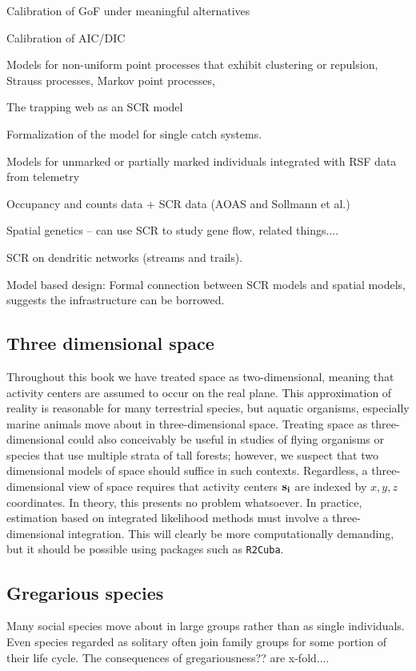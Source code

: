 Calibration of GoF under meaningful alternatives

Calibration of AIC/DIC 

Models for non-uniform point processes that exhibit clustering or
repulsion, Strauss processes, Markov point processes, 

The trapping web as an SCR model 

Formalization of the model for single catch systems. 

Models for unmarked or partially marked individuals integrated with
RSF data from telemetry

Occupancy and counts data + SCR data (AOAS and Sollmann et al.)

Spatial genetics  -- can use SCR to study gene flow, related things....

SCR on dendritic networks (streams and trails).

Model based design: Formal connection between SCR models and spatial
models, suggests the infrastructure can be borrowed.

\subsection{Three dimensional space}

Throughout this book we have treated space as
two-dimensional, meaning that activity centers are assumed to occur on
the real plane. This approximation of reality is reasonable for many
terrestrial species, but aquatic organisms, especially marine animals
move about in three-dimensional space. Treating space as
three-dimensional could also conceivably be useful in studies of flying organisms
or species that use multiple strata of tall forests; however, we
suspect that two dimensional models of space should suffice in such
contexts. Regardless, a three-dimensional view of space requires that
activity centers $\bf s_i$ are indexed by
$x,y,z$ coordinates. In theory, this presents no problem whatsoever. In
practice, estimation based on integrated likelihood methods must
involve a three-dimensional integration. This will clearly be more
computationally demanding, but it should be possible using packages
such as {\tt R2Cuba}.




\subsection{Gregarious species}

Many social species move about in large groups rather than as single
individuals. Even species regarded as solitary often join family
groups for some portion of their life cycle. The consequences of
gregariousness?? are x-fold....

